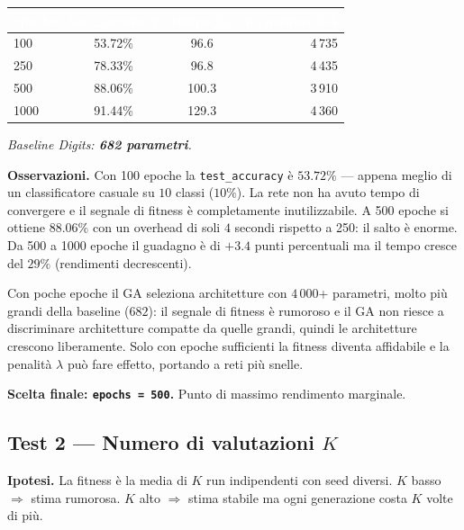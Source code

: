 \documentclass[11pt,a4paper]{article}
\newcommand{\fnt}{\texttt}     %
\begin{document}
\begin{center}
\begin{tabular}{lccr}
    \toprule
    \rowcolor{headerblue}
    \textcolor{white}{\textbf{epochs}} &
    \textcolor{white}{\textbf{test\_accuracy}} &
    \textcolor{white}{\textbf{tempo (s)}} &
    \textcolor{white}{\textbf{n\_params GA}} \\
    \midrule
    100   & 53.72\%  & 96.6   & 4\,735 \\
    \rowcolor{rowgray}
    250   & 78.33\%  & 96.8   & 4\,435 \\
    500   & 88.06\%  & 100.3  & 3\,910 \\
    \rowcolor{rowgray}
    1000  & 91.44\%  & 129.3  & 4\,360 \\
    \bottomrule
\end{tabular}
\end{center}

\textit{Baseline Digits: \textbf{682 parametri}.}

\textbf{Osservazioni.}
Con 100 epoche la \texttt{test\_accuracy} è $53.72\%$ — appena meglio di
un classificatore casuale su $10$ classi ($10\%$). La rete non ha avuto
tempo di convergere e il segnale di fitness è completamente inutilizzabile.
A 500 epoche si ottiene $88.06\%$ con un overhead di soli $4$ secondi
rispetto a 250: il salto è enorme. Da 500 a 1000 epoche il guadagno è di
$+3.4$ punti percentuali ma il tempo cresce del $29\%$ (rendimenti
decrescenti).

Con poche epoche il GA seleziona architetture con $4\,000$+ parametri,
molto più grandi della baseline ($682$): il segnale di fitness è rumoroso
e il GA non riesce a discriminare architetture compatte da quelle grandi,
quindi le architetture crescono liberamente. Solo con epoche sufficienti
la fitness diventa affidabile e la penalità $\lambda$ può fare effetto,
portando a reti più snelle.

\textbf{Scelta finale: \fnt{epochs = 500}.} Punto di massimo rendimento
marginale.

\subsection{Test 2 — Numero di valutazioni $K$}

\textbf{Ipotesi.} La fitness è la media di $K$ run indipendenti con seed
diversi. $K$ basso $\Rightarrow$ stima rumorosa. $K$ alto $\Rightarrow$
stima stabile ma ogni generazione costa $K$ volte di più.
\end{document}
